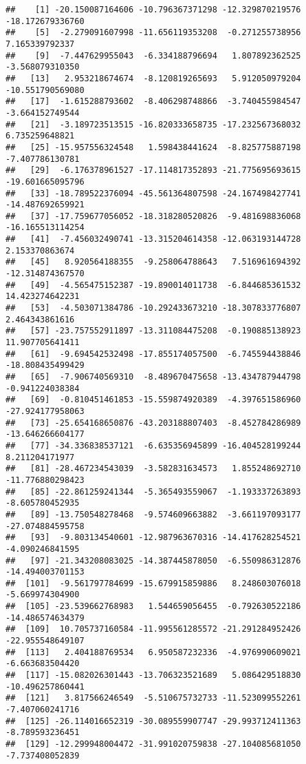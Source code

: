 \documentclass[
]{article}
\begin{document}
\begin{verbatim}
##    [1] -20.150087164606 -10.796367371298 -12.329870219576 -18.172679336760
##    [5]  -2.279091607998 -11.656119353208  -0.271255738956   7.165339792337
##    [9]  -7.447629955043  -6.334188796694   1.807892362525  -3.568079310350
##   [13]   2.953218674674  -8.120819265693   5.912050979204 -10.551790569080
##   [17]  -1.615288793602  -8.406298748866  -3.740455984547  -3.664152749544
##   [21]  -3.189723513515 -16.820333658735 -17.232567368032   6.735259648821
##   [25] -15.957556324548   1.598438441624  -8.825775887198  -7.407786130781
##   [29]  -6.176378961527 -17.114817352893 -21.775695693615 -19.601665095796
##   [33] -18.789522376094 -45.561364807598 -24.167498427741 -14.487692659921
##   [37] -17.759677056052 -18.318280520826  -9.481698836068 -16.165513114254
##   [41]  -7.456032490741 -13.315204614358 -12.063193144728   2.153370863674
##   [45]   8.920564188355  -9.258064788643   7.516961694392 -12.314874367570
##   [49]  -4.565475152387 -19.890014011738  -6.844685361532  14.423274642231
##   [53]  -4.503071384786 -10.292433673210 -18.307833776807   2.464343861616
##   [57] -23.757552911897 -13.311084475208  -0.190885138923  11.907705641411
##   [61]  -9.694542532498 -17.855174057500  -6.745594438846 -18.808435499429
##   [65]  -7.906740569310  -8.489670475658 -13.434787944798  -0.941224038384
##   [69]  -0.810451461853 -15.559874920389  -4.397651586960 -27.924177958063
##   [73] -25.654168650876 -43.203188807403  -8.452784286989 -13.646266604177
##   [77] -34.336838537121  -6.635356945899 -16.404528199244   8.211204171977
##   [81] -28.467234543039  -3.582831634573   1.855248692710 -11.776880298423
##   [85] -22.861259241344  -5.365493559067  -1.193337263893  -8.605780452935
##   [89] -13.750548278468  -9.574609663882  -3.661197093177 -27.074884595758
##   [93]  -9.803134540601 -12.987963670316 -14.417628254521  -4.090246841595
##   [97] -21.343208083025 -14.387445878050  -6.550986312876 -14.494003701153
##  [101]  -9.561797784699 -15.679915859886   8.248603076018  -5.669974304900
##  [105] -23.539662768983   1.544659056455  -0.792630522186 -14.486574634379
##  [109]  10.705737160584 -11.995561285572 -21.291284952426 -22.955548649107
##  [113]   2.404188769534   6.950587232336  -4.976990609021  -6.663683504420
##  [117] -15.082026301443 -13.706323521689   5.086429518830 -10.496257860441
##  [121]   3.817566246549  -5.510675732733 -11.523099552261  -7.407060241716
##  [125] -26.114016652319 -30.089559907747 -29.993712411363  -8.789593236451
##  [129] -12.299948004472 -31.991020759838 -27.104085681050  -7.737408052839

\end{verbatim}
\end{document}
